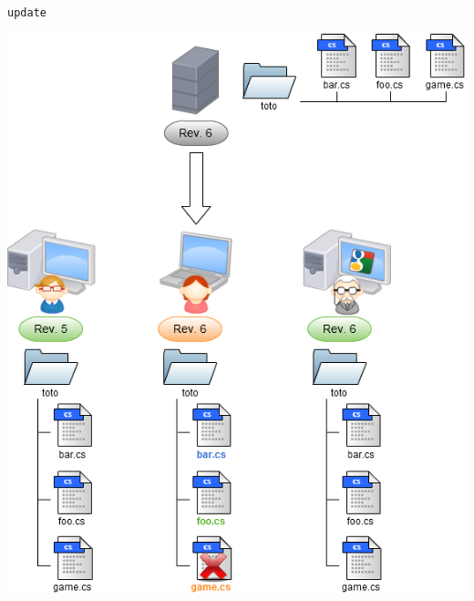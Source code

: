 \begin{frame}
  \texttt{update}
  \begin{center}
    \vspace{-12pt}
    \includegraphics[scale=0.3]{images/9-Update_merge.png}
  \end{center}
\end{frame}

